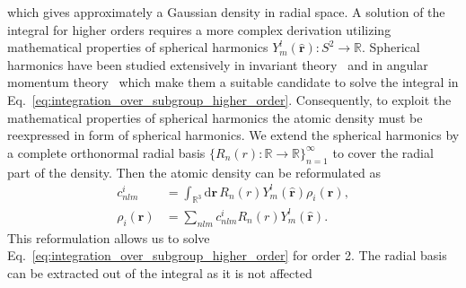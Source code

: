 which gives approximately a Gaussian density in radial space.
A solution of the integral for higher orders requires a more complex derivation utilizing mathematical properties of spherical harmonics $Y_m^l(\hat{\mathbf{r}}):S^2\rightarrow\mathbb{R}$. %
Spherical harmonics have been studied extensively in invariant theory~\cite{dowker2008spherical} and in angular momentum theory~\cite{yutsis1965theory} which make them a suitable candidate to solve the integral in Eq.~\eqref{eq:integration_over_subgroup_higher_order}.
Consequently, to exploit the mathematical properties of spherical harmonics the atomic density must be reexpressed in form of spherical harmonics.
We extend the spherical harmonics by a complete orthonormal radial basis $\{R_n(r) :\mathbb{R}\rightarrow\mathbb{R}\}_{n=1}^\infty$ to cover the radial part of the density.
Then the atomic density can be reformulated as
\begin{subequations}
\begin{align}
  c^i_{nlm} &= \int_{\mathbb{R}^3}\mathrm{d}\mathbf{r}\, R_n(r)Y^l_m(\hat{\mathbf{r}})\rho_i(\mathbf{r}), \\
  \rho_i(\mathbf{r}) &= \sum_{nlm} c^i_{nlm}R_n(r)Y^l_m(\hat{\mathbf{r}}).
  \label{eq:radial_angular_density}
\end{align}
\end{subequations}
This reformulation allows us to solve Eq.~\eqref{eq:integration_over_subgroup_higher_order} for order 2.
The radial basis can be extracted out of the integral as it is not affected 
